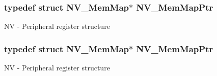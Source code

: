 \subsubsection[{\texorpdfstring{N\+V\+\_\+\+Mem\+Map\+Ptr}{NV_MemMapPtr}}]{\setlength{\rightskip}{0pt plus 5cm}typedef struct {\bf N\+V\+\_\+\+Mem\+Map}$\ast$ {\bf N\+V\+\_\+\+Mem\+Map\+Ptr}}\hypertarget{group___n_v___peripheral_ga9aac431b01e6b976f2f4e32409ab725f}{}\label{group___n_v___peripheral_ga9aac431b01e6b976f2f4e32409ab725f}
NV -\/ Peripheral register structure 
\subsubsection[{\texorpdfstring{N\+V\+\_\+\+Mem\+Map\+Ptr}{NV_MemMapPtr}}]{\setlength{\rightskip}{0pt plus 5cm}typedef struct {\bf N\+V\+\_\+\+Mem\+Map}$\ast$ {\bf N\+V\+\_\+\+Mem\+Map\+Ptr}}\hypertarget{group___n_v___peripheral_ga9aac431b01e6b976f2f4e32409ab725f}{}\label{group___n_v___peripheral_ga9aac431b01e6b976f2f4e32409ab725f}
NV -\/ Peripheral register structure 